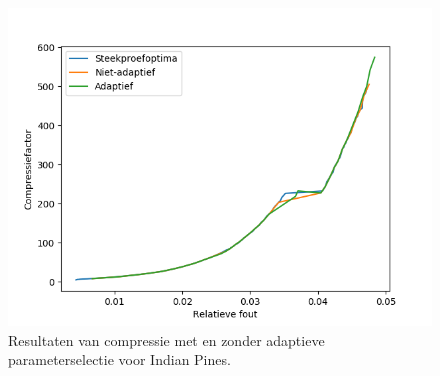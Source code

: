 \begin{figure}[H]
  \centering
  \includegraphics[scale=0.7]{images/parameter_functions_results_including_adaptive_Indian_Pines_tensor_trains.png}
  \caption{Resultaten van compressie met en zonder adaptieve parameterselectie voor Indian Pines.}
  \label{fig:parameter_functions_results_including_adaptive_Indian_Pines_tensor_trains}
\end{figure}

\newpage

